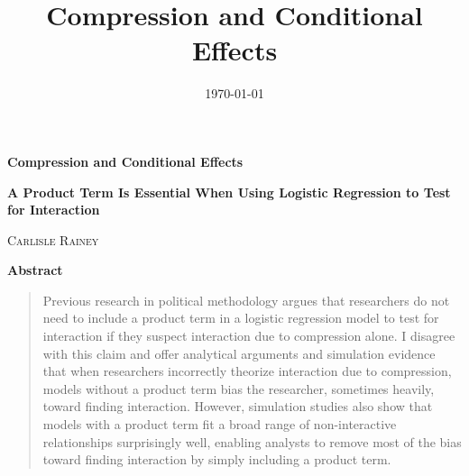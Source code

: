 \documentclass[12pt]{article}
\title{Compression and Conditional Effects}
\date{\today}
\begin{document}
\begin{center}
\LARGE{\textbf{Compression and Conditional Effects}}\\\vspace{4mm}

\normalsize{\textbf{A Product Term Is Essential When Using Logistic Regression to Test for Interaction}}\\\vspace{4mm}

\normalsize{\textsc{Carlisle Rainey}}\\\vspace{2mm}
\end{center}

\thispagestyle{empty}
{\centerline{\textbf{Abstract}}}
\begin{quote}\noindent Previous research in political methodology argues that researchers do not need to include a product term in a logistic regression model to test for interaction if they suspect interaction due to compression alone. I disagree with this claim and offer analytical arguments and simulation evidence that when researchers incorrectly theorize interaction due to compression, models without a product term bias the researcher, sometimes heavily, toward finding interaction. However, simulation studies also show that models with a product term fit a broad range of non-interactive relationships surprisingly well, enabling analysts to remove most of the bias toward finding interaction by simply including a product term.\end{quote}
\thispagestyle{empty}
\singlespace
\setcounter{page}{1}
\end{document}
